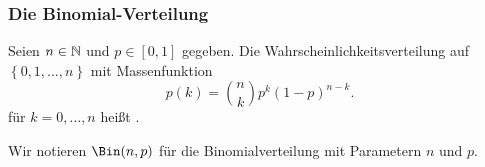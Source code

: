 \subsubsection{Die Binomial-Verteilung}
\begin{definition}\label{def:binomial-verteilung}
    Seien $n\in \mathbb{N}$ und $p\in [0,1]$ gegeben. Die Wahrscheinlichkeitsverteilung auf $\left \{0,1,\ldots,n\right\} $ mit Massenfunktion
    \[
        p(k) = \binom{n}{k}p^k(1-p)^{n-k}
    .\] 
    für $k=0,\ldots,n$ heißt . 
\end{definition}
\begin{notation}
    Wir notieren $\Bin(n,p)$ für die Binomialverteilung mit Parametern  $n$ und  $p$.
\end{notation}

